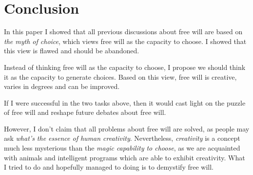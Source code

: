 \section{Conclusion}

In this paper I showed that all previous discussions about free will are based on \emph{the myth of choice}, which views free will as the capacity to choose. I showed that this view is flawed and should be abandoned.

Instead of thinking free will as the capacity to choose, I propose we should think it as the capacity to generate choices. Based on this view, free will is creative, varies in degrees and can be improved.

If I were successful in the two tasks above, then it would cast light on the puzzle of free will and reshape future debates about free will.

However, I don't claim that all problems about free will are solved, as people may ask \emph{what's the essence of human creativity}. Nevertheless, \emph{creativity} is a concept much less mysterious than the \emph{magic capability to choose}, as we are acquainted with animals and intelligent programs which are able to exhibit creativity. What I tried to do and hopefully managed to doing is to demystify free will.
